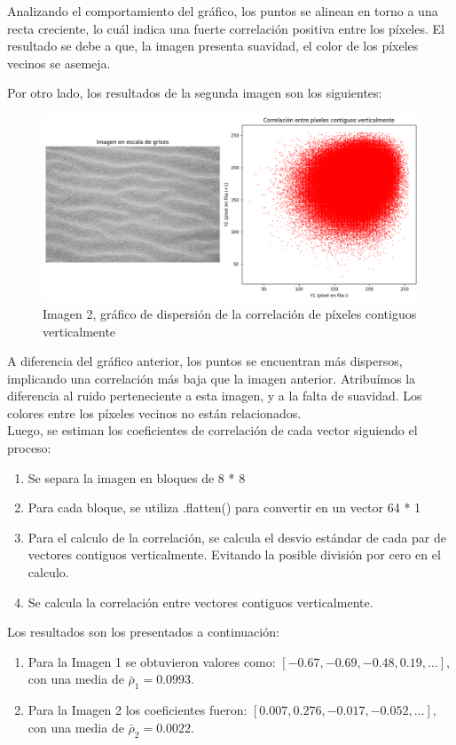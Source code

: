 \documentclass[a4paper,12pt]{article}
\begin{document}
Analizando el comportamiento del gráfico, los puntos se alinean en torno a una recta creciente, lo cuál indica una fuerte correlación positiva entre los píxeles.
El resultado se debe a que, la imagen presenta suavidad, el color de los píxeles vecinos se asemeja.

Por otro lado, los resultados de la segunda imagen son los siguientes:

\begin{figure}[H]
    \centering
    \includegraphics[width=1\textwidth]{Ejercicio1b.png}
    \caption{Imagen 2, gráfico de dispersión de la correlación de píxeles contiguos verticalmente}
    \label{fig:correlacion2}
\end{figure}

A diferencia del gráfico anterior, los puntos se encuentran más dispersos, implicando una correlación más baja que la imagen anterior.
Atribuímos la diferencia al ruido perteneciente a esta imagen, y a la falta de suavidad. Los colores entre los píxeles vecinos no están relacionados.
\\
Luego, se estiman los coeficientes de correlación de cada vector siguiendo el proceso:

\begin{enumerate}
    \item Se separa la imagen en bloques de 8 * 8
    \item Para cada bloque, se utiliza .flatten() para convertir en un vector 64 * 1
    \item Para el calculo de la correlación, se calcula el desvio estándar de cada par de vectores contiguos verticalmente. 
    Evitando la posible división por cero en el calculo.
    \item Se calcula la correlación entre vectores contiguos verticalmente.
\end{enumerate}

Los resultados son los presentados a continuación:
\begin{enumerate}
    \item Para la Imagen 1 se obtuvieron valores como: 
    $[-0.67, -0.69, -0.48, 0.19, \dots]$, 
    con una media de $\bar{\rho}_1 = 0.0993$. 

    \item Para la Imagen 2 los coeficientes fueron: 
    $[0.007, 0.276, -0.017, -0.052, \dots]$, 
    con una media de $\bar{\rho}_2 = 0.0022$.
\end{enumerate}
\end{document}
